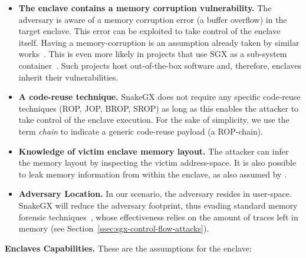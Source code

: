 \begin{itemize}
	\item \textbf{The enclave contains a memory corruption vulnerability.}  
	The adversary is aware of a memory corruption error (\eg a buffer overflow) 
	in the target enclave.
	This error can be exploited to take control of the enclave itself.
	Having a memory-corruption is an assumption already taken by similar 
	works~\citep{biondo2018guard,lee2017hacking}.
	This is even more likely in projects that use SGX as a sub-system 
	container~\citep{baumann2015shielding,203255,seo2017sgx,199364}.
	Such projects host out-of-the-box software and, therefore, enclaves inherit 
	their vulnerabilities.
	\item \textbf{A code-reuse technique.} 
	SnakeGX does not require any specific code-reuse techniques (\eg ROP, 
	JOP, BROP, SROP) as long as this enables the attacker to take control of 
	the enclave execution. For the sake of simplicity, we use 
	the term \emph{chain} to indicate a generic code-reuse payload 
	(\eg a ROP-chain).
	\item \textbf{Knowledge of victim enclave memory layout.} 
	The attacker can infer the memory layout by inspecting the victim 
	address-space.
	It is also possible to leak memory information from within the enclave, as
	also assumed by \cite{biondo2018guard}.
	\item \textbf{Adversary Location.} In our scenario, the adversary 
	resides in user-space. SnakeGX will reduce the adversary
	footprint, thus evading standard memory forensic 	
	techniques~\citep{stancill2013check,polychronakis2011rop,kittel2015counteracting,Graziano:2016:RFA:2897845.2897894},
	whose effectiveness relies on the amount of traces left in memory 
	(see Section~\ref{ssec:sgx-control-flow-attacks}).
\end{itemize}

\textbf{Enclaves Capabilities.}
These are the assumptions for the enclave:

